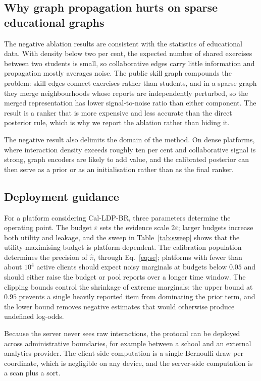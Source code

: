 \documentclass[pdflatex,sn-basic,Numbered]{sn-jnl}
\theoremstyle{plain}
\theoremstyle{remark}
\theoremstyle{definition}
\newcommand{\eps}{\varepsilon}
\begin{document}
\subsection{Why graph propagation hurts on sparse educational graphs}

The negative ablation results are consistent with the statistics of educational data. With density below two per cent, the expected number of shared exercises between two students is small, so collaborative edges carry little information and propagation mostly averages noise. The public skill graph compounds the problem: skill edges connect exercises rather than students, and in a sparse graph they merge neighbourhoods whose reports are independently perturbed, so the merged representation has lower signal-to-noise ratio than either component. The result is a ranker that is more expensive and less accurate than the direct posterior rule, which is why we report the ablation rather than hiding it.

The negative result also delimits the domain of the method. On dense platforms, where interaction density exceeds roughly ten per cent and collaborative signal is strong, graph encoders are likely to add value, and the calibrated posterior can then serve as a prior or as an initialisation rather than as the final ranker.

\subsection{Deployment guidance}

For a platform considering Cal-LDP-BR, three parameters determine the operating point. The budget $\eps$ sets the evidence scale $2\eps$; larger budgets increase both utility and leakage, and the sweep in Table~\ref{tab:sweep} shows that the utility-maximising budget is platform-dependent. The calibration population determines the precision of $\hat\pi_i$ through Eq.~\eqref{eq:se}; platforms with fewer than about $10^{4}$ active clients should expect noisy marginals at budgets below $0.05$ and should either raise the budget or pool reports over a longer time window. The clipping bounds control the shrinkage of extreme marginals: the upper bound at $0.95$ prevents a single heavily reported item from dominating the prior term, and the lower bound removes negative estimates that would otherwise produce undefined log-odds.

Because the server never sees raw interactions, the protocol can be deployed across administrative boundaries, for example between a school and an external analytics provider. The client-side computation is a single Bernoulli draw per coordinate, which is negligible on any device, and the server-side computation is a scan plus a sort.
\end{document}
